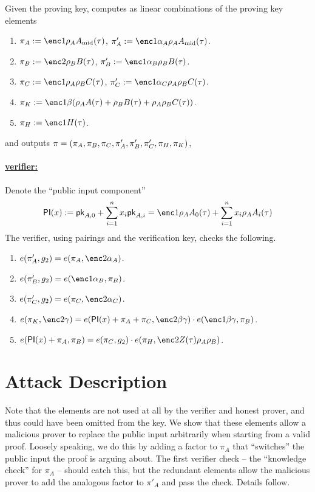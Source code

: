 \documentclass[11pt]{article}
\numberwithin{figure}{section} %
\begin{document}
Given the proving key, \per computes as linear combinations of the proving key elements
\begin{enumerate}
\item $\pi_A\defeq \enc1{\rho_A \Amid(\tau)}$, $\pi'_A\defeq \enc1{\alpha_A\rho_A \Amid(\tau)}$.
\item $\pi_B\defeq \enc2{\rho_B B(\tau)}$, $\pi'_B \defeq \enc1{\alpha_B\rho_B B(\tau)}$.
\item $\pi_C\defeq \enc1{\rho_A\rho_B C(\tau)}$, $\pi'_C \defeq \enc1{\alpha_C\rho_A\rho_B C(\tau)}$.
\item $\pi_K\defeq \enc1{\beta(\rho_A A(\tau) + \rho_B B(\tau) + \rho_A\rho_B C(\tau))}$.
\item $\pi_H\defeq \enc1{H(\tau)}$.
 \end{enumerate}
 and outputs $\pi = (\pi_A,\pi_B,\pi_C,\pi'_A,\pi'_B,\pi'_C,\pi_H,\pi_K)$,
 

\paragraph{\underline{\bctv verifier:}\\}
Denote the ``public input component'' 
\[ \PI(x) \defeq \pk_{A,0} + \sum_{i=1}^n x_i \pk_{A,i} = \enc1{\rho_A A_0(\tau) + \sum_{i=1}^n x_i \rho_A A_i(\tau) }\]
 The verifier, using pairings and the verification key, checks the following.
\begin{enumerate}
 \item $e(\pi'_A,g_2)=e(\pi_A,\enc2{\alpha_A})$.
\item $e(\pi'_B, g_2)=e(\enc1{\alpha_B},\pi_B)$.
\item $e(\pi'_C,g_2)=e(\pi_C,\enc2{\alpha_C})$.
\item $e(\pi_K,\enc2{\gamma})=e(\PI(x)+\pi_A+\pi_C,\enc2{\beta\gamma})\cdot e(\enc1{\beta\gamma},\pi_B)$.
\item $e(\PI(x)+\pi_A,\pi_B)= e(\pi_C,g_2)\cdot e(\pi_H,\enc2{Z(\tau)\rho_A\rho_B})$.
 \end{enumerate}
 
 \section{Attack Description}\label{sec:attack}
 Note that the elements  are not used at all by the verifier and honest prover, and thus could have been omitted from the key. We show that these elements allow a malicious prover to replace the public input arbitrarily when starting from a valid proof.
 Loosely speaking, we do this by adding a factor to $\pi_A$ that ``switches'' the public input the proof is arguing about.
 The first verifier check -- the ``knowledge check'' for $\pi_A$ -- should catch this, but the redundant elements allow the malicious prover to add
 the analogous factor to $\pi'_A$ and pass the check. Details follow.
 
\end{document}
